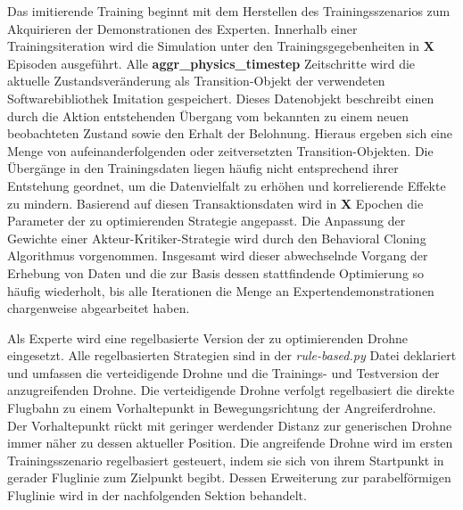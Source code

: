 Das imitierende Training beginnt mit dem Herstellen des Trainingsszenarios zum Akquirieren der Demonstrationen des Experten. 
Innerhalb einer Trainingsiteration wird die Simulation unter den Trainingsgegebenheiten in \textbf{X} Episoden ausgeführt.
Alle \textbf{aggr\_physics\_timestep} Zeitschritte wird die aktuelle Zustandsveränderung als Transition-Objekt der verwendeten Softwarebibliothek Imitation gespeichert.
Dieses Datenobjekt beschreibt einen durch die Aktion entstehenden Übergang vom bekannten zu einem neuen beobachteten Zustand sowie den Erhalt der Belohnung.
Hieraus ergeben sich eine Menge von aufeinanderfolgenden oder zeitversetzten Transition-Objekten.
Die Übergänge in den Trainingsdaten liegen häufig nicht entsprechend ihrer Entstehung geordnet, um die Datenvielfalt zu erhöhen und korrelierende Effekte zu mindern. 
Basierend auf diesen Transaktionsdaten wird in \textbf{X} Epochen die Parameter der zu optimierenden Strategie angepasst.
Die Anpassung der Gewichte einer Akteur-Kritiker-Strategie wird durch den Behavioral Cloning Algorithmus vorgenommen.
Insgesamt wird dieser abwechselnde Vorgang der Erhebung von Daten und die zur Basis dessen stattfindende Optimierung so häufig wiederholt, bis alle Iterationen die Menge an Expertendemonstrationen chargenweise abgearbeitet haben.

Als Experte wird eine regelbasierte Version der zu optimierenden Drohne eingesetzt. 
Alle regelbasierten Strategien sind in der \textit{rule-based.py} Datei deklariert und umfassen die verteidigende Drohne und die Trainings- und Testversion der anzugreifenden Drohne.
Die verteidigende Drohne verfolgt regelbasiert die direkte Flugbahn zu einem Vorhaltepunkt in Bewegungsrichtung der Angreiferdrohne.
Der Vorhaltepunkt rückt mit geringer werdender Distanz zur generischen Drohne immer näher zu dessen aktueller Position.
Die angreifende Drohne wird im ersten Trainingsszenario regelbasiert gesteuert, indem sie sich von ihrem Startpunkt in gerader Fluglinie zum Zielpunkt begibt.
Dessen Erweiterung zur parabelförmigen Fluglinie wird in der nachfolgenden Sektion behandelt. 

